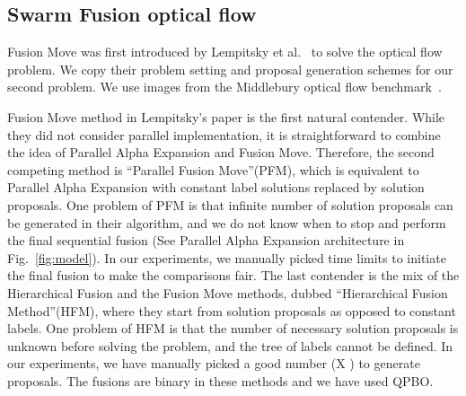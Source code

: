 \subsection{Swarm Fusion optical flow}

Fusion Move was first introduced by Lempitsky et al.~\cite{viktor} to
solve the optical flow problem.
We copy their problem setting and proposal generation schemes for
our second problem.  We use images from the Middlebury optical flow
benchmark~\cite{middlebury_optical_flow}.


\noindent Fusion Move method in Lempitsky's paper is the first natural
contender. While they did not consider parallel implementation, it is
straightforward to combine the idea of Parallel Alpha Expansion and
Fusion Move. Therefore, the second competing method is ``Parallel Fusion
Move''(PFM), which is equivalent to Parallel Alpha Expansion with constant
label solutions replaced by solution proposals.
%
One problem of PFM is that infinite number of solution proposals can be
generated in their algorithm, and we do not know when to stop and
perform the final sequential fusion (See Parallel Alpha Expansion
architecture in Fig.~\ref{fig:model}). In our experiments, we manually
picked time limits to initiate the final fusion to make the comparisons
fair.
%
The last contender is the mix of the Hierarchical Fusion and the Fusion
Move methods, dubbed ``Hierarchical Fusion Method''(HFM), where they
start from solution proposals as opposed to constant labels. One problem
of HFM is that the number of necessary solution proposals is unknown
before solving the problem, and the tree of labels cannot be defined. In
our experiments, we have manually picked a good number (X ) to generate proposals.
%
The fusions are binary in these methods and we have used QPBO.


